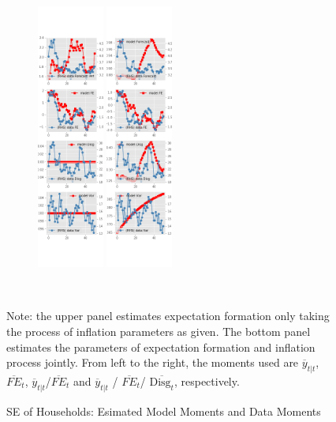 \documentclass[]{article}
\begin{document}
\begin{figure}[ht]
\begin{subfigure}[b]{\textwidth}
		\includegraphics[width=0.24\textwidth]{figures/sce_se_est_joint_diag2.png}
		\includegraphics[width=0.24\textwidth]{figures/sce_se_est_joint_diag3.png}
	\end{subfigure}
	\\
	\begin{flushleft}
		{\footnotesize Note: the upper panel estimates expectation formation only taking the process of inflation parameters as given. The bottom panel estimates the parameters of expectation formation and inflation process jointly. From left to the right, the moments used are $\overline y_{t|t}$, $\overline{FE}_{t}$, $\overline y_{t|t}$/$\overline{FE}_{t}$ and $\overline y_{t|t}$ / $\overline{FE}_{t}$/ $\overline{\textrm{Disg}_t}$, respectively.}
	\end{flushleft}
	\caption{SE of Households: Esimated Model Moments and Data Moments}
\end{figure}
\end{document}
